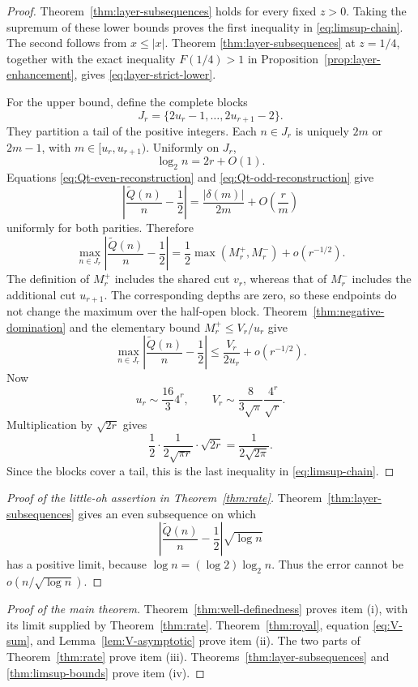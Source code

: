 \documentclass[11pt]{article}
\theoremstyle{definition}
\theoremstyle{remark}
\newcommand{\Qt}{\widetilde Q}
\begin{document}
\begin{proof}
Theorem~\ref{thm:layer-subsequences} holds for every fixed \(z>0\).  Taking
the supremum of these lower bounds proves the first inequality in
\eqref{eq:limsup-chain}.  The second follows from \(x\leq |x|\).  Theorem
\ref{thm:layer-subsequences} at \(z=1/4\), together with the exact inequality
\(F(1/4)>1\) in Proposition~\ref{prop:layer-enhancement}, gives
\eqref{eq:layer-strict-lower}.

For the upper bound, define the complete blocks
\[
 J_r=\{2u_r-1,\ldots,2u_{r+1}-2\}.
\]
They partition a tail of the positive integers.  Each \(n\in J_r\) is
uniquely \(2m\) or \(2m-1\), with \(m\in[u_r,u_{r+1})\).  Uniformly on \(J_r\),
\[
 \log_2 n=2r+O(1).
\]
Equations \eqref{eq:Qt-even-reconstruction} and
\eqref{eq:Qt-odd-reconstruction} give
\begin{equation*}
 \left|\frac{\Qt(n)}n-\frac12\right|
 =\frac{|\delta(m)|}{2m}+O\!\left(\frac r m\right)
\end{equation*}
uniformly for both parities.  Therefore
\[
 \max_{n\in J_r}
 \left|\frac{\Qt(n)}n-\frac12\right|
 =\frac12\max(M_r^+,M_r^-)+o(r^{-1/2}).
\]
The definition of \(M_r^+\) includes the shared cut \(v_r\), whereas that of
\(M_r^-\) includes the additional cut \(u_{r+1}\).  The corresponding depths are zero, so
these endpoints do not change the maximum over the half-open block.
Theorem~\ref{thm:negative-domination} and the elementary bound
\(M_r^+\leq V_r/u_r\) give
\[
 \max_{n\in J_r}
 \left|\frac{\Qt(n)}n-\frac12\right|
 \leq\frac{V_r}{2u_r}+o(r^{-1/2}).
\]
Now
\[
 u_r\sim\frac{16}{3}4^r,
 \qquad
 V_r\sim\frac{8}{3\sqrt\pi}\frac{4^r}{\sqrt r}.
\]
Multiplication by \(\sqrt{2r}\) gives
\[
 \frac12\cdot\frac1{2\sqrt{\pi r}}\cdot\sqrt{2r}
 =\frac1{2\sqrt{2\pi}}.
\]
Since the blocks cover a tail, this is the last inequality in
\eqref{eq:limsup-chain}.
\end{proof}

\begin{proof}[Proof of the little-oh assertion in Theorem~\ref{thm:rate}]
Theorem~\ref{thm:layer-subsequences} gives an even subsequence on which
\[
 \left|\frac{\Qt(n)}n-\frac12\right|\sqrt{\log n}
\]
has a positive limit, because \(\log n=(\log 2)\log_2 n\).  Thus the error
cannot be \(o(n/\sqrt{\log n})\).
\end{proof}

\begin{proof}[Proof of the main theorem]
Theorem~\ref{thm:well-definedness} proves item (i), with its limit supplied by
Theorem~\ref{thm:rate}.  Theorem~\ref{thm:royal}, equation
\eqref{eq:V-sum}, and Lemma~\ref{lem:V-asymptotic} prove item (ii).
The two parts of Theorem~\ref{thm:rate} prove item (iii).
Theorems~\ref{thm:layer-subsequences} and \ref{thm:limsup-bounds} prove item
(iv).
\end{proof}
\end{document}
